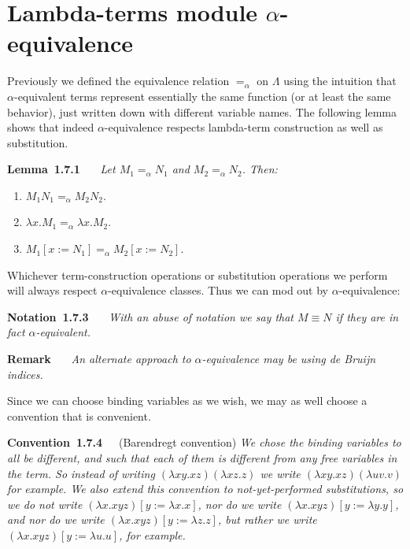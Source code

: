 \documentclass[letterpaper]{article}
\newenvironment{lemma}[2][]{\par\medskip
	\noindent \textbf{Lemma~#2}~~~#1 \rmfamily\em}{\medskip}
\newenvironment{remarkNonNum}[1][]{\par\medskip
	\noindent \textbf{Remark}~~~#1 \rmfamily\em}{\medskip}
\newenvironment{notation}[2][]{\par\medskip
	\noindent \textbf{Notation~#2}~~~#1 \rmfamily\em}{\medskip}
\newenvironment{convention}[2][]{\par\medskip
	\noindent \textbf{Convention~#2}~~~#1 \rmfamily\em}{\medskip}
\renewcommand{\l}{\lambda}
\newcommand{\aeq}{=_\alpha}
\begin{document}

\section{Lambda-terms module $\alpha$-equivalence}
Previously we defined the equivalence relation $\aeq$ on $\Lambda$ using the intuition that $\alpha$-equivalent terms represent essentially the same function (or at least the same behavior), just written down with different variable names. The following lemma shows that indeed $\alpha$-equivalence respects lambda-term construction as well as substitution.

\begin{lemma}{1.7.1}
	Let $M_1 \aeq N_1$ and $M_2 \aeq N_2$. Then:
	\begin{enumerate}
		\item $M_1 N_1 \aeq M_2 N_2$.
		\item $\l x. M_1 \aeq \l x . M_2$.
		\item $M_1[x := N_1] \aeq M_2[x := N_2]$.
	\end{enumerate}
\end{lemma}

Whichever term-construction operations or substitution operations we perform will always respect $\alpha$-equivalence classes. Thus we can mod out by $\alpha$-equivalence:

\begin{notation}{1.7.3}
	With an abuse of notation we say that $M \equiv N$ if they are in fact $\alpha$-equivalent.
\end{notation}

\begin{remarkNonNum}
	An alternate approach to $\alpha$-equivalence may be using de Bruijn indices.
\end{remarkNonNum}

Since we can choose binding variables as we wish, we may as well choose a convention that is convenient.

\begin{convention}[(Barendregt convention)]{1.7.4}
	We chose the binding variables to all be different, and such that each of them is different from any free variables in the term. So instead of writing $(\l x y . x z)(\l x z . z)$ we write $(\l x y. x z)(\l u v . v)$ for example. We also extend this convention to not-yet-performed substitutions, so we do not write $(\l x .  x y z)[y := \l x.x]$, nor do we write $(\l x .  x y z)[y := \l y.y]$, and nor do we write $(\l x .  x y z)[y := \l z.z]$, but rather we write $(\l x .  x y z)[y := \l u.u]$, for example.
\end{convention}
\end{document}
